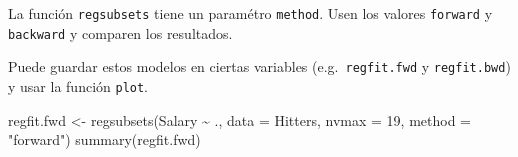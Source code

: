 \documentclass[
  12pt,
]{book}
\newenvironment{Shaded}{\begin{snugshade}}{\end{snugshade}}
\newcommand{\AttributeTok}[1]{\textcolor[rgb]{0.77,0.63,0.00}{#1}}
\newcommand{\DecValTok}[1]{\textcolor[rgb]{0.00,0.00,0.81}{#1}}
\newcommand{\FunctionTok}[1]{\textcolor[rgb]{0.00,0.00,0.00}{#1}}
\newcommand{\NormalTok}[1]{#1}
\newcommand{\OtherTok}[1]{\textcolor[rgb]{0.56,0.35,0.01}{#1}}
\newcommand{\SpecialCharTok}[1]{\textcolor[rgb]{0.00,0.00,0.00}{#1}}
\newcommand{\StringTok}[1]{\textcolor[rgb]{0.31,0.60,0.02}{#1}}
\theoremstyle{definition}
\theoremstyle{definition}
\theoremstyle{definition}
\theoremstyle{remark}
\begin{document}
La función \texttt{regsubsets} tiene un paramétro \texttt{method}. Usen los valores \texttt{forward} y \texttt{backward} y comparen los resultados.

Puede guardar estos modelos en ciertas variables (e.g.~\texttt{regfit.fwd} y \texttt{regfit.bwd}) y usar la función \texttt{plot}.

\begin{Shaded}
\begin{Highlighting}[]
\NormalTok{regfit.fwd }\OtherTok{\textless{}{-}} \FunctionTok{regsubsets}\NormalTok{(Salary }\SpecialCharTok{\textasciitilde{}}\NormalTok{ ., }\AttributeTok{data =}\NormalTok{ Hitters, }
    \AttributeTok{nvmax =} \DecValTok{19}\NormalTok{, }\AttributeTok{method =} \StringTok{"forward"}\NormalTok{)}
\FunctionTok{summary}\NormalTok{(regfit.fwd)}
\end{Highlighting}
\end{Shaded}
\end{document}
